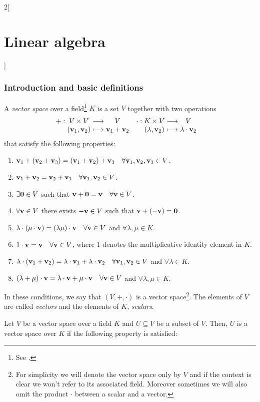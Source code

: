 \documentclass[../../../main_math.tex]{subfiles}
\begin{document}
\begin{multicols}{2}[\section{Linear algebra}]
  \subsubsection{Introduction and basic definitions}
  \begin{definition}
    A \emph{vector space} over a field\footnote{See .} $K$ is a set $V$ together with two operations
    \begin{align*}
      \function{+}{V\times V}{V}{(\vf{v}_1,\vf{v}_2)}{\vf{v}_1+ \vf{v}_2} & \function{\cdot}{K\times V}{V}{(\lambda,\vf{v}_2)}{\lambda\cdot\vf{v}_2}
    \end{align*}
    that satisfy the following properties:
    \begin{enumerate}
      \item $\boldsymbol{\mathrm{v}}_1+(\boldsymbol{\mathrm{v}}_2+\boldsymbol{\mathrm{v}}_3)=(\boldsymbol{\mathrm{v}}_1+\boldsymbol{\mathrm{v}}_2)+\boldsymbol{\mathrm{v}}_3\quad\forall\boldsymbol{\mathrm{v}}_1,\boldsymbol{\mathrm{v}}_2,\boldsymbol{\mathrm{v}}_3\in V$.
      \item $\boldsymbol{\mathrm{v}}_1+\boldsymbol{\mathrm{v}}_2=\boldsymbol{\mathrm{v}}_2+\boldsymbol{\mathrm{v}}_1\quad\forall\boldsymbol{\mathrm{v}}_1,\boldsymbol{\mathrm{v}}_2\in V$.
      \item $\exists\boldsymbol{\mathrm{0}}\in V$ such that $\boldsymbol{\mathrm{v}}+\boldsymbol{\mathrm{0}}=\boldsymbol{\mathrm{v}}\quad\forall\boldsymbol{\mathrm{v}}\in V$.
      \item $\forall\boldsymbol{\mathrm{v}}\in V$ there exists $-\boldsymbol{\mathrm{v}}\in V$ such that $\boldsymbol{\mathrm{v}}+(-\boldsymbol{\mathrm{v}})=\boldsymbol{\mathrm{0}}$.
      \item $\lambda\cdot(\mu\cdot\boldsymbol{\mathrm{v}})=(\lambda\mu)\cdot\boldsymbol{\mathrm{v}}\quad\forall\boldsymbol{\mathrm{v}}\in V$ and $\forall\lambda,\mu\in K$.
      \item $1\cdot\boldsymbol{\mathrm{v}}=\boldsymbol{\mathrm{v}}\quad\forall\boldsymbol{\mathrm{v}}\in V$, where 1 denotes the multiplicative identity element in $K$.
      \item $\lambda\cdot(\boldsymbol{\mathrm{v}}_1+\boldsymbol{\mathrm{v}}_2)=\lambda\cdot\boldsymbol{\mathrm{v}}_1+\lambda\cdot\boldsymbol{\mathrm{v}}_2\quad\forall\boldsymbol{\mathrm{v}}_1,\boldsymbol{\mathrm{v}}_2\in V$ and $\forall\lambda\in K$.
      \item $(\lambda+\mu)\cdot\boldsymbol{\mathrm{v}}=\lambda\cdot\boldsymbol{\mathrm{v}}+\mu\cdot\boldsymbol{\mathrm{v}}\quad\forall\boldsymbol{\mathrm{v}}\in V$ and $\forall\lambda,\mu\in K$.
    \end{enumerate}
    In these conditions, we say that $(V,+,\cdot)$ is a vector space\footnote{For simplicity we will denote the vector space only by $V$ and if the context is clear we won't refer to its associated field. Moreover sometimes we will also omit the product $\cdot$ between a scalar and a vector.}. The elements of $V$ are called \emph{vectors} and the elements of $K$, \emph{scalars}.
  \end{definition}
  \begin{definition}
    Let $V$ be a vector space over a field $K$ and $U\subseteq V$ be a subset of $V$. Then, $U$ is a vector space over $K$ if the following property is satisfied:

\end{definition}
\end{multicols}
\end{document}
